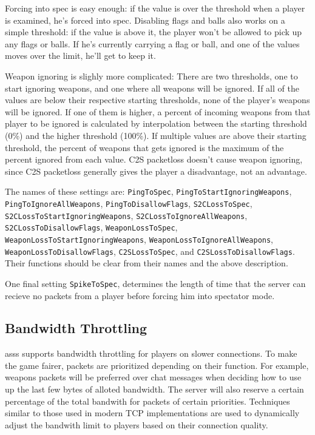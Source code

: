 \documentclass{article}
\newcommand{\asss}{asss}
\begin{document}
Forcing into spec is easy enough: if the value is over the threshold
when a player is examined, he's forced into spec. Disabling flags and
balls also works on a simple threshold: if the value is above it, the
player won't be allowed to pick up any flags or balls. If he's currently
carrying a flag or ball, and one of the values moves over the limit,
he'll get to keep it.

Weapon ignoring is slighly more complicated: There are two thresholds,
one to start ignoring weapons, and one where all weapons will be
ignored. If all of the values are below their respective starting
thresholds, none of the player's weapons will be ignored. If one of them
is higher, a percent of incoming weapons from that player to be ignored
is calculated by interpolation between the starting threshold (0\%) and
the higher threshold (100\%). If multiple values are above their
starting threshold, the percent of weapons that gets ignored is the
maximum of the percent ignored from each value. C2S packetloss doesn't
cause weapon ignoring, since C2S packetloss generally gives the player a
disadvantage, not an advantage.

The names of these settings are:
\texttt{PingToSpec},
\texttt{PingToStartIgnoringWeapons},
\texttt{PingToIgnoreAllWeapons},
\texttt{PingToDisallowFlags},
\texttt{S2CLossToSpec},
\texttt{S2CLossToStartIgnoringWeapons},
\texttt{S2CLossToIgnoreAllWeapons},
\texttt{S2CLossToDisallowFlags},
\texttt{WeaponLossToSpec},
\texttt{WeaponLossToStartIgnoringWeapons},
\texttt{WeaponLossToIgnoreAllWeapons},
\texttt{WeaponLossToDisallowFlags},
\texttt{C2SLossToSpec},
and
\texttt{C2SLossToDisallowFlags}. Their functions should be clear from
their names and the above description.

One final setting \texttt{SpikeToSpec}, determines the length of time
that the server can recieve no packets from a player before forcing him
into spectator mode.


\subsection{Bandwidth Throttling}

\asss{} supports bandwidth throttling for players on slower connections.
To make the game fairer, packets are prioritized depending on their
function. For example, weapons packets will be preferred over chat
messages when deciding how to use up the last few bytes of alloted
bandwidth. The server will also reserve a certain percentage of the
total bandwith for packets of certain priorities. Techniques similar to
those used in modern TCP implementations are used to dynamically adjust
the bandwith limit to players based on their connection quality.
\end{document}

